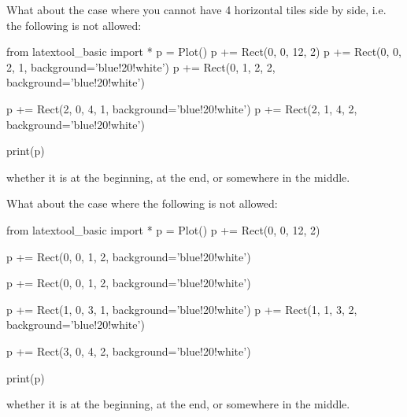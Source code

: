 \newpage
\begin{ex}
  What about the case where you cannot have 4 horizontal tiles side by side,
  i.e. the following is not allowed:
\begin{python}
from latextool_basic import *
p = Plot()
p += Rect(0, 0, 12, 2)
p += Rect(0, 0, 2, 1, background='blue!20!white')
p += Rect(0, 1, 2, 2, background='blue!20!white')

p += Rect(2, 0, 4, 1, background='blue!20!white')
p += Rect(2, 1, 4, 2, background='blue!20!white')

print(p)
\end{python}
whether it is at the beginning, at the end, or somewhere in the middle.
\end{ex}

\begin{ex}
  What about the case where the following is not allowed:
\begin{python}
from latextool_basic import *
p = Plot()
p += Rect(0, 0, 12, 2)

p += Rect(0, 0, 1, 2, background='blue!20!white')

p += Rect(0, 0, 1, 2, background='blue!20!white')

p += Rect(1, 0, 3, 1, background='blue!20!white')
p += Rect(1, 1, 3, 2, background='blue!20!white')

p += Rect(3, 0, 4, 2, background='blue!20!white')

print(p)
\end{python}
whether it is at the beginning, at the end, or somewhere in the middle.
\end{ex}


